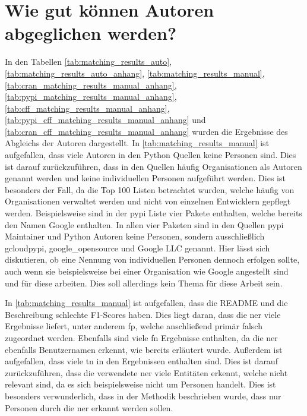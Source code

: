 \section{Wie gut können Autoren abgeglichen werden?}
\label{sec:abgleich_diskussion}
In den Tabellen \ref{tab:matching_results_auto}, \ref{tab:matching_results_auto_anhang}, \ref{tab:matching_results_manual},\ref{tab:cran_matching_results_manual_anhang}, \ref{tab:pypi_matching_results_manual_anhang}, \ref{tab:cff_matching_results_manual_anhang}, \ref{tab:pypi_cff_matching_results_manual_anhang} und \ref{tab:cran_cff_matching_results_manual_anhang} wurden die Ergebnisse des Abgleichs der Autoren dargestellt.
In \autoref{tab:matching_results_manual} ist aufgefallen, dass viele Autoren in den Python Quellen keine Personen sind.
Dies ist darauf zurückzuführen, dass in den Quellen häufig Organisationen als Autoren genannt werden und keine individuellen Personen aufgeführt werden.
Dies ist besonders der Fall, da die Top 100 Listen betrachtet wurden, welche häufig von Organisationen verwaltet werden und nicht von einzelnen Entwicklern gepflegt werden.
Beispielsweise sind in der \gls{pypi} Liste vier Pakete enthalten, welche bereits den Namen Google enthalten.
In allen vier Paketen sind in den Quellen \gls{pypi} Maintainer und Python Autoren keine Personen, sondern ausschließlich \glqq gcloudpypi\grqq{}, \glqq google\_opensource\grqq{} und \glqq Google LLC\grqq{} genannt.
Hier lässt sich diskutieren, ob eine Nennung von individuellen Personen dennoch erfolgen sollte, auch wenn sie beispielsweise bei einer Organisation wie Google angestellt sind und für diese arbeiten.
Dies soll allerdings kein Thema für diese Arbeit sein.

In \autoref{tab:matching_results_manual} ist aufgefallen, dass die README und die Beschreibung schlechte F1-Scores haben.
Dies liegt daran, dass die \gls{ner} viele Ergebnisse liefert, unter anderem \gls{fp}, welche anschließend primär falsch zugeordnet werden.
Ebenfalls sind viele \gls{fn} Ergebnisse enthalten, da die \gls{ner} ebenfalls Benutzernamen erkennt, wie bereits erläutert wurde.
Außerdem ist aufgefallen, dass viele \gls{tn} in den Ergebnissen enthalten sind.
Dies ist darauf zurückzuführen, dass die verwendete \gls{ner} viele Entitäten erkennt, welche nicht relevant sind, da es sich beispielsweise nicht um Personen handelt.
Dies ist besonders verwunderlich, dass in der Methodik beschrieben wurde, dass nur Personen durch die \gls{ner} erkannt werden sollen.

